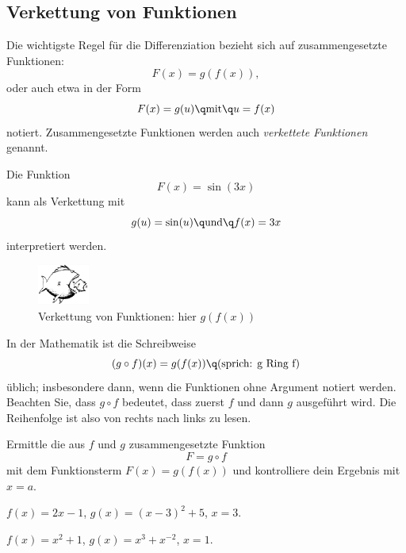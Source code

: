 \documentclass[%
11pt,%
twoside,%
titlepage,%
german,%
headsepline%
]{scrartcl}
\begin{document}
\subsection{Verkettung von Funktionen}
Die wichtigste Regel f\"ur die Differenziation bezieht sich auf zusammengesetzte Funktionen:
$$F(x)=g(f(x)),$$
oder auch etwa in der Form
$$F(x)=g(u)\q\text{mit}\q u=f(x)$$
notiert. Zusammengesetzte Funktionen werden auch \emph{verkettete Funktionen} genannt.
\begin{bsp}
Die Funktion
$$F(x)=\sin(3x)$$
kann als Verkettung mit
$$g(u)=\sin(u)\q\text{und}\q f(x)=3x$$
interpretiert werden.
\end{bsp}
\begin{figure}[b]
\begin{center}
\includegraphics[width=0.15\textwidth]{pictures/verkettung}
\end{center}
\caption{Verkettung von Funktionen: hier $g(f(x))$}
\end{figure}
In der Mathematik ist die Schreibweise
$$(g\circ f)(x)=g(f(x))\q\text{(sprich: g Ring f)}$$
\"ublich; insbesondere dann, wenn die Funktionen ohne Argument notiert werden. Beachten Sie, dass $g\circ f$ bedeutet, dass zuerst $f$ und dann $g$ ausgef\"uhrt wird. Die Reihenfolge ist also von rechts nach links zu lesen.

\begin{ueb}[Ring]\label{uebring}
Ermittle die aus $f$ und $g$ zusammengesetzte Funktion
$$F=g\circ f$$
mit dem Funktionsterm $F(x)=g(f(x))$ und kontrolliere dein Ergebnis mit $x=a$.
\begin{enumeratea}
\item $f(x)=2x-1$, $g(x)=(x-3)^2+5$, $x=3$.
\item $f(x)=x^2+1$, $g(x)=x^3+x^{-2}$, $x=1$.
\end{enumeratea}
\end{ueb}
\end{document}
